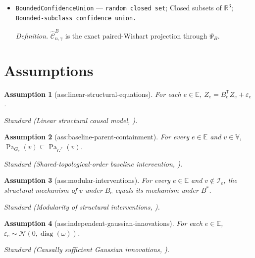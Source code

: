 \documentclass{article}
\newtheorem{assumption}{Assumption}
\begin{document}
\begin{itemize}
  \par\smallskip\noindent\emph{Definition.} \(\Psi_B(s)\) is the compatible-completion direct-effect fiber restricted to \(\mathcal M_{p,B}^{\mathrm{df}}\).
  \item \texttt{BoundedConfidenceUnion} --- \texttt{random closed set}; Closed subsets of \(\mathbb R^3\); \texttt{Bounded-\allowbreak{}subclass confidence union.}
  \par\smallskip\noindent\emph{Definition.} \(\widehat{\mathcal C}^{B}_{n,\gamma}\) is the exact paired-Wishart projection through \(\Psi_B\).
\end{itemize}

\section{Assumptions}

\begin{assumption}[ass:linear-structural-equations]\label{ass:linear-structural-equations}
For each \(e\in\mathbb E\), \(Z_e=B_e^{\mathsf T}Z_e+\varepsilon_e\).
\par\smallskip\noindent\emph{Standard} (Linear structural causal model, \cite{BystrovaDevijver2026LDiffPC}).
\end{assumption}

\begin{assumption}[ass:baseline-parent-containment]\label{ass:baseline-parent-containment}
For every \(e\in\mathbb E\) and \(v\in\mathbb V\), \(\operatorname{Pa}_{G_e}(v)\subseteq\operatorname{Pa}_{G^*}(v)\).
\par\smallskip\noindent\emph{Standard} (Shared-topological-order baseline intervention, \cite{BystrovaDevijver2026LDiffPC}).
\end{assumption}

\begin{assumption}[ass:modular-interventions]\label{ass:modular-interventions}
For every \(e\in\mathbb E\) and \(v\notin\mathcal I_e\), the structural mechanism of \(v\) under \(B_e\) equals its mechanism under \(B^*\).
\par\smallskip\noindent\emph{Standard} (Modularity of structural interventions, \cite{BystrovaDevijver2026LDiffPC}).
\end{assumption}

\begin{assumption}[ass:independent-gaussian-innovations]\label{ass:independent-gaussian-innovations}
For each \(e\in\mathbb E\), \(\varepsilon_e\sim\mathcal N(0,\operatorname{diag}(\omega))\).
\par\smallskip\noindent\emph{Standard} (Causally sufficient Gaussian innovations, \cite{WangSquiresBelyaevaUhler2018DCI}).
\end{assumption}
\end{document}
